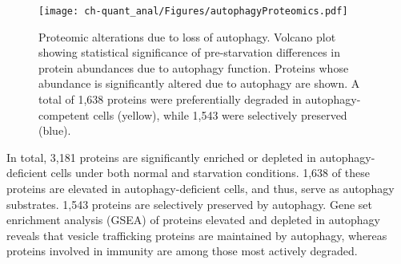 \begin{figure}[h!]
\begin{center}
\texttt{[image: ch-quant\_anal/Figures/autophagyProteomics.pdf]}
\caption[Proteomic alterations due to loss of autophagy]{Proteomic alterations due to loss of autophagy. Volcano plot showing statistical significance of pre-starvation differences in protein abundances due to autophagy function. Proteins whose abundance is significantly altered due to autophagy are shown. A total of 1,638 proteins were preferentially degraded in autophagy-competent cells (yellow), while 1,543 were selectively preserved (blue).}
\label{ch-quant_anal:autophagyProteomics}
\end{center}
\end{figure}

In total, 3,181 proteins are significantly enriched or depleted in autophagy-deficient cells under both normal and starvation conditions. 1,638 of these proteins are elevated in autophagy-deficient cells, and thus, serve as autophagy substrates. 1,543 proteins are selectively preserved by autophagy.  Gene set enrichment analysis (GSEA) of proteins elevated and depleted in autophagy reveals that vesicle trafficking proteins are maintained by autophagy, whereas proteins involved in immunity are among those most actively degraded.


